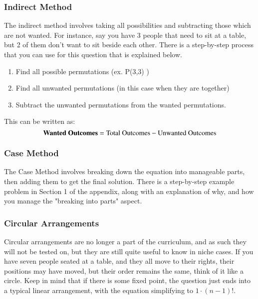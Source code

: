 \documentclass[final,1p,12pt]{elsarticle}
\begin{document}
        \subsubsection{Indirect Method}
        The indirect method involves taking all possibilities and subtracting those which are not wanted. For instance, say you have 3 people that need to sit at a table, but 2 of them don't want to sit beside each other. There is a step-by-step process that you can use for this question that is explained below.
        \begin{enumerate}
                \item Find all possible permutations (ex. P(3,3) )
                \item Find all unwanted permutations (in this case when they are together)
                \item Subtract the unwanted permutations from the wanted permutations.
            \end{enumerate}
        This can be written as:
        \begin{equation*}
            \mbox{\textbf{Wanted Outcomes}} = \mbox{Total Outcomes}-\mbox{Unwanted Outcomes}
        \end{equation*}
    
        \subsubsection{Case Method}
        The Case Method involves breaking down the equation into manageable parts, then adding them to get the final solution. There is a step-by-step example problem in Section 1 of the appendix, along with an explanation of why, and how you manage the "breaking into parts" aspect.

    \clearpage
    
        \subsubsection{Circular Arrangements}
        Circular arrangements are no longer a part of the curriculum, and as such they will not be tested on, but they are still quite useful to know in niche cases. If you have seven people seated at a table, and they all move to their rights, their positions may have moved, but their order remains the same, think of it like a circle. Keep in mind that if there is some fixed point, the question just ends into a typical linear arrangement, with the equation simplifying to $1 \cdot (n-1)!$.
       
\end{document}
